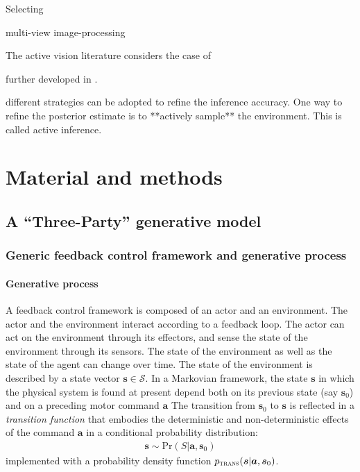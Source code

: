 \documentclass[12pt,twoside,openright]{article}
\begin{document}
Selecting 

multi-view image-processing

The active vision literature considers the case of 




further developed in \cite{najemnik2005optimal,butko2010infomax,ahmad2013active,potthast2016active}.



{ different strategies can be adopted to refine the inference accuracy. One way to refine the posterior estimate is to **actively sample** the environment. This is called active inference.} 



\section{Material and methods}

\subsection{A ``Three-Party'' generative model}\label{sec:three-party}

\subsubsection{Generic feedback control framework and generative process}
\paragraph{Generative process}
A feedback control framework is composed of an actor and an environment. The actor and the environment interact according to a feedback loop. 
The actor can act on the environment through its effectors, and sense the state of the environment through its sensors. 
The state of the environment as well as the state of the agent can change over time. The state of the environment is described by a state vector $\boldsymbol{s} \in \mathcal{S}$.
In a Markovian framework, the state $\boldsymbol{s}$ in which the physical system is found at present depend both on its previous state (say $\boldsymbol{s}_0$) and on a preceding motor command $\boldsymbol{a}$ 
The transition from $\boldsymbol{s}_0$ to $\boldsymbol{s}$ is reflected in a \emph{transition function} that embodies the deterministic and non-deterministic effects of the command $\boldsymbol{a}$ in a conditional probability distribution:  
\begin{align}
\boldsymbol{s} \sim \text{Pr}(S|\boldsymbol{a},\boldsymbol{s}_0) \label{eq:process}
\end{align}
implemented with a probability density function 
$p_\text{\sc trans}(\boldsymbol{s}|\boldsymbol{a},\boldsymbol{s}_0)$.
\end{document}
